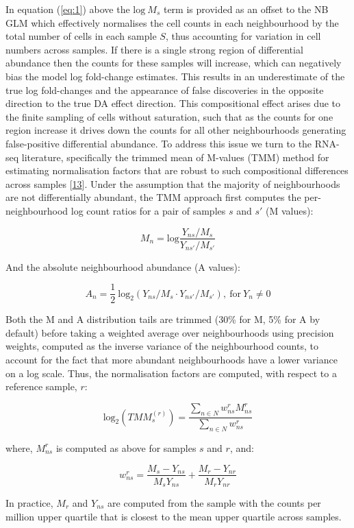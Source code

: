 \documentclass[
]{article}
\begin{document}
In equation (\ref{eq:1}) above the \(\mbox{log}\ M_s\) term is provided as an offset to the NB GLM which effectively normalises the cell counts in
each neighbourhood by the total number of cells in each sample \(S\), thus accounting for variation in cell numbers across samples. If there is a
single strong region of differential abundance then the counts for these samples will increase, which can negatively bias the model log fold-change
estimates. This results in an underestimate of the true log fold-changes and the appearance of false discoveries in the opposite direction to the
true DA effect direction. This compositional effect arises due to the finite sampling of cells without saturation, such that as the counts for one
region increase it drives down the counts for all other neighbourhoods generating false-positive differential abundance. To address this issue we
turn to the RNA-seq literature, specifically the trimmed mean of M-values (TMM) method for estimating normalisation factors that
are robust to such compositional differences across samples {[}\protect\hyperlink{ref-robinsonTMM2010}{13}{]}. Under the assumption that the majority of neighbourhoods are
not differentially abundant, the TMM approach first computes the per-neighbourhood log count ratios for a pair of samples \(s\) and \(s'\)
(M values):

\[ 
M_{n} = \mbox{log} \frac{Y_{ns}/M_s}{Y_{ns'}/M_{s'}}
\]

And the absolute neighbourhood abundance (A values):

\[
A_{n} = \frac{1}{2}\ \mbox{log}_{2} (Y_{ns}/M_{s} \cdot Y_{ns'}/M_{s'}),\ \mbox{for}\ Y_{n} \neq 0
\]

Both the M and A distribution tails are trimmed (30\% for M, 5\% for A by default) before taking a weighted average over neighbourhoods using precision weights,
computed as the inverse variance of the neighbourhood counts, to account for the fact that more abundant neighbourhoods have a lower variance on a
log scale. Thus, the normalisation factors are computed, with respect to a reference sample, \(r\):

\[
\mbox{log}_2(TMM_{s}^{(r)})= \frac{\sum_{n \in N} w^r_{ns}M^r_{ns}}{\sum_{n \in N} w^r_{ns}}
\]

where, \(M^r_{ns}\) is computed as above for samples \(s\) and \(r\), and:

\[
w^r_{ns} = \frac{M_s-Y_{ns}}{M_sY_{ns}} + \frac{M_r-Y_{nr}}{M_rY_{nr}}
\]

In practice, \(M_r\) and \(Y_{ns}\) are computed from the sample with the counts per million upper quartile that is closest to the mean upper quartile across samples.
\end{document}
